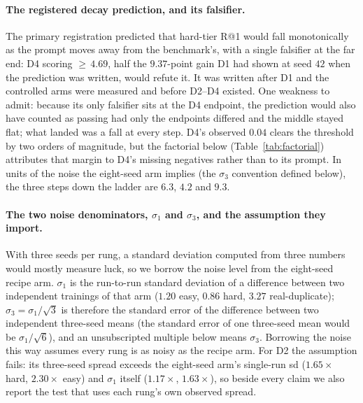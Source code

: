 \paragraph{The registered decay prediction, and its falsifier.}
The primary registration predicted that hard-tier R@1 would fall monotonically as the prompt moves away from the benchmark's, with a single falsifier at the far end: D4 scoring ${\ge}\,4.69$, half the $9.37$-point gain D1 had shown at seed $42$ when the prediction was written, would refute it. It was written after D1 and the controlled arms were measured and before D2--D4 existed. One weakness to admit: because its only falsifier sits at the D4 endpoint, the prediction would also have counted as passing had only the endpoints differed and the middle stayed flat; what landed was a fall at every step. D4's observed $0.04$ clears the threshold by two orders of magnitude, but the factorial below (Table~\ref{tab:factorial}) attributes that margin to D4's missing negatives rather than to its prompt. In units of the noise the eight-seed arm implies (the $\sigma_3$ convention defined below), the three steps down the ladder are $6.3$, $4.2$ and $9.3$.

\paragraph{The two noise denominators, $\sigma_1$ and $\sigma_3$, and the assumption they import.}
With three seeds per rung, a standard deviation computed from three numbers would mostly measure luck, so we borrow the noise level from the eight-seed recipe arm. $\sigma_1$ is the run-to-run standard deviation of a difference between two independent trainings of that arm ($1.20$ easy, $0.86$ hard, $3.27$ real-duplicate); $\sigma_3 = \sigma_1/\sqrt{3}$ is therefore the standard error of the difference between two independent three-seed means (the standard error of one three-seed mean would be $\sigma_1/\sqrt{6}$), and an unsubscripted multiple below means $\sigma_3$. Borrowing the noise this way assumes every rung is as noisy as the recipe arm. For D2 the assumption fails: its three-seed spread exceeds the eight-seed arm's single-run sd ($1.65\times$ hard, $2.30\times$ easy) and $\sigma_1$ itself ($1.17\times$, $1.63\times$), so beside every claim we also report the test that uses each rung's own observed spread.

